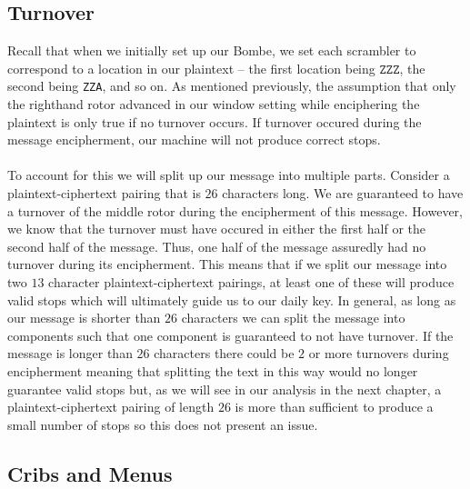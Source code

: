 \subsection{Turnover}
Recall that when we initially set up our Bombe, we set each scrambler
to correspond to a location in our plaintext -- the first location
being $\texttt{ZZZ}$, the second being \texttt{ZZA}, and so on. As
mentioned previously, the assumption that only the righthand rotor
advanced in our window setting while enciphering the plaintext is
only true if no turnover occurs. If turnover occured during the
message encipherment, our machine will not produce correct stops.
\\\\To account for this we will split up our message into multiple
parts. Consider a plaintext-ciphertext pairing that is $26$
characters long. We are guaranteed to have a turnover of the middle
rotor during the encipherment of this message. However, we know that
the turnover must have occured in either the first half or the second
half of the message. Thus, one half of the message assuredly had no
turnover during its encipherment. This means that if we split our
message into two $13$ character plaintext-ciphertext pairings, at
least one of these will produce valid stops which will ultimately
guide us to our daily key. In general, as long as our message is
shorter than $26$ characters we can split the message into components
such that one component is guaranteed to not have turnover. If the
message is longer than $26$ characters there could be $2$ or more
turnovers during encipherment meaning that splitting the text in this
way would no longer guarantee valid stops but, as we will see in our
analysis in the next chapter, a plaintext-ciphertext pairing of
length $26$ is more than sufficient to produce a small number of
stops so this does not present an issue.
\subsection{Cribs and Menus}

